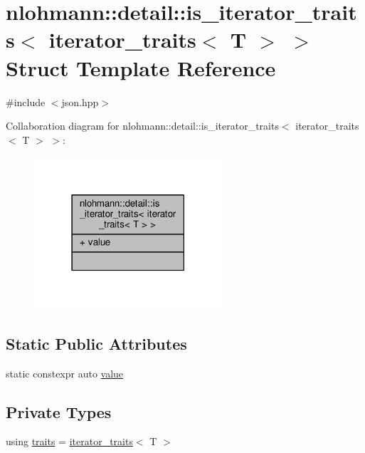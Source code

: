 \hypertarget{structnlohmann_1_1detail_1_1is__iterator__traits_3_01iterator__traits_3_01T_01_4_01_4}{}\section{nlohmann\+:\+:detail\+:\+:is\+\_\+iterator\+\_\+traits$<$ iterator\+\_\+traits$<$ T $>$ $>$ Struct Template Reference}
\label{structnlohmann_1_1detail_1_1is__iterator__traits_3_01iterator__traits_3_01T_01_4_01_4}


{\ttfamily \#include $<$json.\+hpp$>$}



Collaboration diagram for nlohmann\+:\+:detail\+:\+:is\+\_\+iterator\+\_\+traits$<$ iterator\+\_\+traits$<$ T $>$ $>$\+:
\nopagebreak
\begin{figure}[H]
\begin{center}
\leavevmode
\includegraphics[width=198pt]{structnlohmann_1_1detail_1_1is__iterator__traits_3_01iterator__traits_3_01T_01_4_01_4__coll__graph}
\end{center}
\end{figure}
\subsection*{Static Public Attributes}
\begin{DoxyCompactItemize}
\item 
static constexpr auto \hyperlink{structnlohmann_1_1detail_1_1is__iterator__traits_3_01iterator__traits_3_01T_01_4_01_4_ac2711760b352b8921accc6609957dc90}{value}
\end{DoxyCompactItemize}
\subsection*{Private Types}
\begin{DoxyCompactItemize}
\item 
using \hyperlink{structnlohmann_1_1detail_1_1is__iterator__traits_3_01iterator__traits_3_01T_01_4_01_4_a1cbceaaa83a3ad294c3cb66b9df48e78}{traits} = \hyperlink{structnlohmann_1_1detail_1_1iterator__traits}{iterator\+\_\+traits}$<$ T $>$
\end{DoxyCompactItemize}


